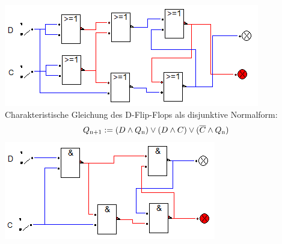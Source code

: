 \documentclass[a4paper, 11pt, fleqn, DIV=10, twoside, BCOR=10mm]{scrreprt}
\begin{document}
\begin{center}
\includegraphics[width=0.5\columnwidth]{DT3Graphics/D-FF-NOR.PNG}
\vspace{20mm}
Charakteristische Gleichung des D-Flip-Flops als disjunktive Normalform:
\begin{equation}
	Q\textsubscript{n+1}:=( D\wedge Q \textsubscript{n} )\vee (D \wedge C) \vee (\overline{C} \wedge Q \textsubscript{n})
\end{equation}
\includegraphics[width=0.5\columnwidth]{DT3Graphics/D-FF-NAND.PNG}
\vspace{10mm}
\end{center}
\end{document}
